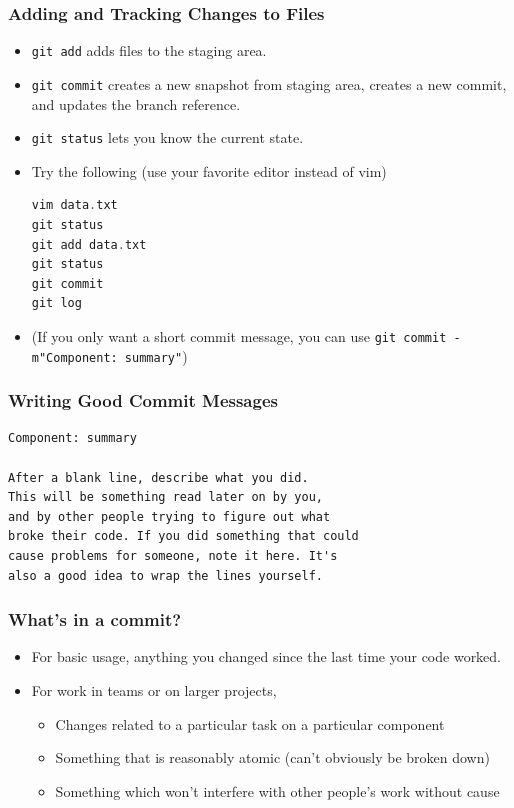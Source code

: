 \documentclass{beamer}
\begin{document}
\begin{frame}[fragile]
\frametitle{Adding and Tracking Changes to Files}
\begin{itemize}
\item \lstinline{git add} adds files to the staging area.
\item \lstinline{git commit} creates a new snapshot from staging area, creates a new commit, and updates the branch reference.
\item \lstinline{git status} lets you know the current state.
\item Try the following (use your favorite editor instead of vim)
\begin{lstlisting}[language=C++]
vim data.txt
git status
git add data.txt
git status
git commit
git log
\end{lstlisting}
\item (If you only want a short commit message, you can use \lstinline{git commit -m"Component: summary"})
\end{itemize}
\end{frame}

\begin{frame}[fragile]
\frametitle{Writing Good Commit Messages}
\begin{verbatim}
Component: summary

After a blank line, describe what you did. 
This will be something read later on by you,
and by other people trying to figure out what
broke their code. If you did something that could 
cause problems for someone, note it here. It's
also a good idea to wrap the lines yourself.
\end{verbatim}
\end{frame}

\begin{frame}[fragile]
\frametitle{What's in a commit?}
\begin{itemize}
\item For basic usage, anything you changed since the last time your code worked.
\item For work in teams or on larger projects,
\begin{itemize}
\item Changes related to a particular task on a particular component
\item Something that is reasonably atomic (can't obviously be broken down)
\item Something which won't interfere with other people's work without cause
\end{itemize}
\end{itemize}
\end{frame}
\end{document}
